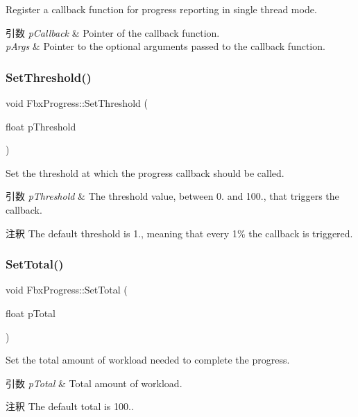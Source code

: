 Register a callback function for progress reporting in single thread mode. 
\begin{DoxyParams}{引数}
{\em p\+Callback} & Pointer of the callback function. \\
\hline
{\em p\+Args} & Pointer to the optional arguments passed to the callback function. \\
\hline
\end{DoxyParams}
\mbox{\label{class_fbx_progress_a0f2eeea6d21c0917acde3e9c08a5a649}} 
\subsubsection{\texorpdfstring{Set\+Threshold()}{SetThreshold()}}
{\footnotesize\ttfamily void Fbx\+Progress\+::\+Set\+Threshold (\begin{DoxyParamCaption}\item[{float}]{p\+Threshold }\end{DoxyParamCaption})}

Set the threshold at which the progress callback should be called. 
\begin{DoxyParams}{引数}
{\em p\+Threshold} & The threshold value, between 0. and 100., that triggers the callback. \\
\hline
\end{DoxyParams}
\begin{DoxyRemark}{注釈}
The default threshold is 1., meaning that every 1\% the callback is triggered. 
\end{DoxyRemark}
\mbox{\label{class_fbx_progress_a5a704be350a16f935729750888644040}} 
\subsubsection{\texorpdfstring{Set\+Total()}{SetTotal()}}
{\footnotesize\ttfamily void Fbx\+Progress\+::\+Set\+Total (\begin{DoxyParamCaption}\item[{float}]{p\+Total }\end{DoxyParamCaption})}

Set the total amount of workload needed to complete the progress. 
\begin{DoxyParams}{引数}
{\em p\+Total} & Total amount of workload. \\
\hline
\end{DoxyParams}
\begin{DoxyRemark}{注釈}
The default total is 100.. 
\end{DoxyRemark}
\mbox{\label{class_fbx_progress_ac67f9c160f7ffc09e9c7454b3bfa6b06}} 
